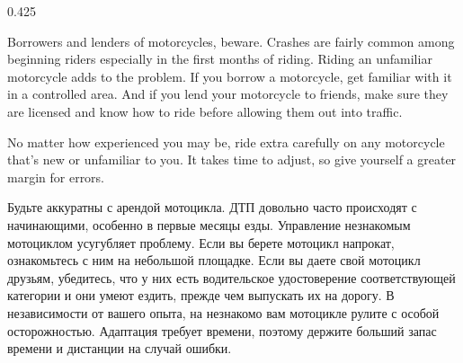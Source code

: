 \begin{langblock}{0.425}
\begin{eng}	
	Borrowers and lenders of motorcycles, beware. Crashes are fairly common among beginning riders especially in the first months of riding. Riding an unfamiliar motorcycle adds to the problem. If you borrow a motorcycle, get familiar with it in a controlled area. And if you lend your motorcycle to friends, make sure they are licensed and know how to ride before allowing them out into traffic.
	
	No matter how experienced you may be, ride extra carefully on any motorcycle that's new or unfamiliar to you. It takes time to adjust, so give yourself a greater margin for errors.
\end{eng}
\begin{rus}
		Будьте аккуратны с арендой мотоцикла. ДТП довольно часто происходят с начинающими, особенно в первые месяцы езды. Управление незнакомым мотоциклом усугубляет проблему. Если вы берете мотоцикл напрокат, ознакомьтесь с ним на небольшой площадке. Если вы даете свой мотоцикл друзьям, убедитесь, что у них есть водительское удостоверение соответствующей категории и они умеют ездить, прежде чем выпускать их на дорогу. В независимости от вашего опыта, на незнакомо вам мотоцикле рулите с особой осторожностью. Адаптация требует времени, поэтому держите больший запас времени и дистанции на случай ошибки.
\end{rus}
\end{langblock}










